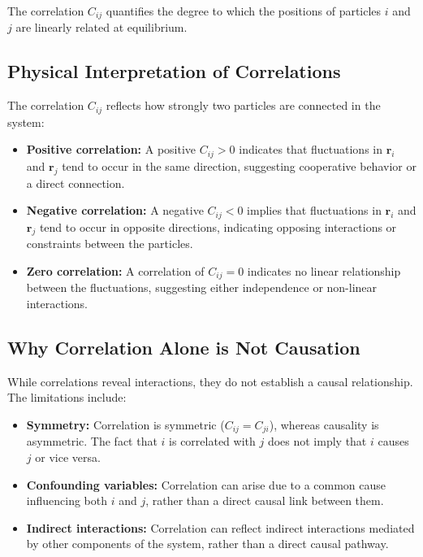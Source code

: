 \documentclass[English, Lau, oneside]{sapthesis}
\begin{document}
The correlation \( C_{ij} \) quantifies the degree to which the positions of particles \( i \) and \( j \) are linearly related at equilibrium.

\subsection{Physical Interpretation of Correlations}

\noindent The correlation \( C_{ij} \) reflects how strongly two particles are connected in the system:
\begin{itemize}
    \item \textbf{Positive correlation:} A positive \( C_{ij} > 0 \) indicates that fluctuations in \( \mathbf{r}_i \) and \( \mathbf{r}_j \) tend to occur in the same direction, suggesting cooperative behavior or a direct connection.
    \item \textbf{Negative correlation:} A negative \( C_{ij} < 0 \) implies that fluctuations in \( \mathbf{r}_i \) and \( \mathbf{r}_j \) tend to occur in opposite directions, indicating opposing interactions or constraints between the particles.
    \item \textbf{Zero correlation:} A correlation of \( C_{ij} = 0 \) indicates no linear relationship between the fluctuations, suggesting either independence or non-linear interactions.
\end{itemize}

\subsection{Why Correlation Alone is Not Causation}

\noindent While correlations reveal interactions, they do not establish a causal relationship. The limitations include:
\begin{itemize}
    \item \textbf{Symmetry:} Correlation is symmetric (\( C_{ij} = C_{ji} \)), whereas causality is asymmetric. The fact that \( i \) is correlated with \( j \) does not imply that \( i \) causes \( j \) or vice versa.
    \item \textbf{Confounding variables:} Correlation can arise due to a common cause influencing both \( i \) and \( j \), rather than a direct causal link between them.
    \item \textbf{Indirect interactions:} Correlation can reflect indirect interactions mediated by other components of the system, rather than a direct causal pathway.
\end{itemize}
\end{document}
